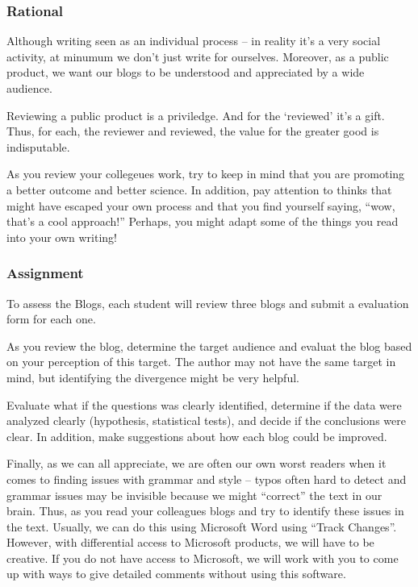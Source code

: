 
\subsubsection{Rational}

Although writing seen as an individual process -- in reality it's a very social activity, at minumum we don't just write for ourselves. Moreover, as a public product, we want our blogs to be understood and appreciated by a wide audience. 

Reviewing a public product is a priviledge. And for the `reviewed' it's a gift. Thus, for each, the reviewer and reviewed, the value for the greater good is indisputable. 

As you review your collegeues work, try to keep in mind that you are promoting a better outcome and better science. In addition, pay attention to thinks that might have escaped your own process and that you find yourself saying, ``wow, that's a cool approach!''  Perhaps, you might adapt some of the things you read into your own writing!

\subsubsection{Assignment}

To assess the Blogs, each student will review three blogs and submit a evaluation form for each one.

As you review the blog, determine the target audience and evaluat the blog based on your perception of this target. The author may not have the same target in mind, but identifying the divergence might be very helpful. 

Evaluate what if the questions was clearly identified, determine if the data were analyzed clearly (hypothesis, statistical tests), and decide if the conclusions were clear. In addition, make suggestions about how each blog could be improved.

Finally, as we can all appreciate, we are often our own worst readers when it comes to finding issues with grammar and style -- typos often hard to detect and grammar issues may be invisible because we might ``correct'' the text in our brain. Thus, as you read your colleagues blogs and try to identify these issues in the text. Usually, we can do this using Microsoft Word using ``Track Changes''. However, with differential access to Microsoft products, we will have to be creative. If you do not have access to Microsoft, we will work with you to come up with ways to give detailed comments without using this software.

